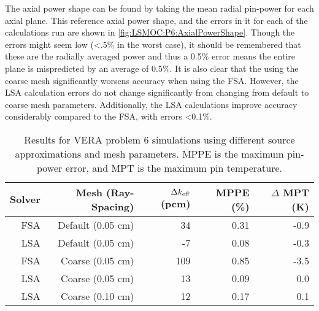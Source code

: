 {{{      The axial power shape can be found by taking the mean radial pin-power for each axial plane.
      This reference axial power shape, and the errors in it for each of the calculations run are shown in \cref{fig:LSMOC:P6:AxialPowerShape}.
      Though the errors might seem low (<.5\% in the worst case), it should be remembered that these are the radially averaged power and thus a 0.5\% error means the entire plane is mispredicted by an average of 0.5\%.
      It is also clear that the using the coarse mesh significantly worsens accuracy when using the \ac{FSA}.
      However, the \ac{LSA} calculation errors do not change significantly from changing from default to coarse mesh parameters.
      Additionally, the \ac{LSA} calculations improve accuracy considerably compared to the \ac{FSA}, with errors <0.1\%.

      \begin{table}[htbp]
        \centering
        \caption{
          Results for VERA problem 6 simulations using different source approximations and mesh parameters.
          MPPE is the maximum pin-power error, and MPT is the maximum pin temperature.}
        \label{tab:LSMOC:P6:Results}
        \begin{tabular}{rrrrr}\toprule
          Solver & Mesh (Ray-Spacing) & $\Delta k_{\text{eff}}$ (pcm) & MPPE (\%) & $\Delta$ MPT (K)\\\midrule
          FSA    & Default (0.05 cm)  & 34    & 0.31 & -0.9\\
          LSA    & Default (0.05 cm)  & -7    & 0.08 & -0.3\\
          FSA    & Coarse  (0.05 cm)  & 109   & 0.85 & -3.5\\
          LSA    & Coarse  (0.05 cm)  & 13    & 0.09 &  0.0\\
          LSA    & Coarse  (0.10 cm)  & 12    & 0.17 &  0.1\\\bottomrule
        \end{tabular}
      \end{table}

}}}
